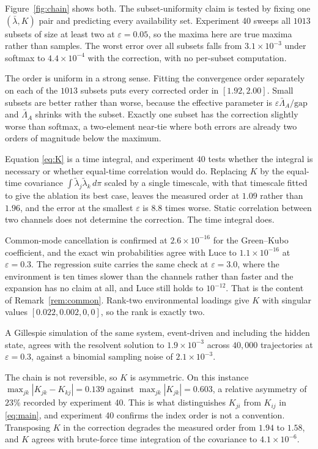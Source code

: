 \documentclass[11pt]{article}
\theoremstyle{remark}
\newcommand{\lbar}{\bar{\lambda}}
\begin{document}
Figure~\ref{fig:chain} shows both. The subset-uniformity claim is tested by
fixing one $(\lbar, K)$ pair and predicting every availability set. Experiment
40 sweeps all $1013$ subsets of size at least two at $\varepsilon = 0.05$, so
the maxima here are true maxima rather than samples. The worst error over all
subsets falls from $3.1\times10^{-3}$ under softmax to $4.4\times10^{-4}$ with
the correction, with no per-subset computation.

The order is uniform in a strong sense. Fitting the convergence order
separately on each of the $1013$ subsets puts every corrected order in
$[1.92, 2.00]$. Small subsets are better rather than worse, because the
effective parameter is $\varepsilon\bar\Lambda_A/\mathrm{gap}$ and
$\bar\Lambda_A$ shrinks with the subset. Exactly one subset has the correction
slightly worse than softmax, a two-element near-tie where both errors are
already two orders of magnitude below the maximum.

Equation \eqref{eq:K} is a time integral, and experiment 40 tests whether the
integral is necessary or whether equal-time correlation would do. Replacing $K$ by the equal-time covariance
$\int \tilde\lambda_j \tilde\lambda_k \, d\pi$ scaled by a single
timescale, with that timescale fitted to give the ablation its best case,
leaves the measured order at $1.09$ rather than $1.96$, and the error at the
smallest $\varepsilon$ is $8.8$ times worse. Static correlation between two
channels does not determine the correction. The time integral does.

Common-mode cancellation is confirmed at $2.6\times10^{-16}$ for the
Green--Kubo coefficient, and the exact win probabilities agree with Luce to
$1.1\times10^{-16}$ at $\varepsilon = 0.3$. The regression suite carries the
same check at $\varepsilon = 3.0$, where the environment is ten times slower
than the channels rather than faster and the expansion has no claim at all,
and Luce still holds to $10^{-12}$. That is the content of
Remark~\ref{rem:common}. Rank-two
environmental loadings give $K$ with singular values
$[0.022, 0.002, 0, 0]$, so the rank is exactly two.

A Gillespie simulation of the same system, event-driven and including the
hidden state, agrees with the resolvent solution to $1.9\times10^{-3}$ across
$40{,}000$ trajectories at $\varepsilon = 0.3$, against a binomial sampling
noise of $2.1\times10^{-3}$.

The chain is not reversible, so $K$ is asymmetric. On this instance
$\max_{jk}|K_{jk} - K_{kj}| = 0.139$ against $\max_{jk}|K_{jk}| = 0.603$, a
relative asymmetry of $23\%$ recorded by experiment 40. This is what distinguishes $K_{ji}$ from
$K_{ij}$ in \eqref{eq:main}, and experiment 40 confirms the index order is not
a convention. Transposing $K$ in the correction degrades the measured order
from $1.94$ to $1.58$, and $K$ agrees with brute-force time integration of the
covariance to $4.1\times10^{-6}$.
\end{document}
